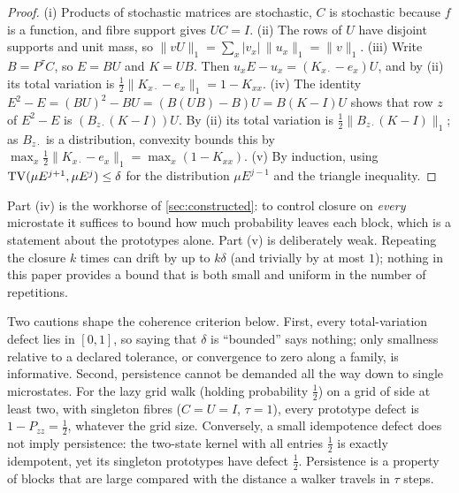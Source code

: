 \begin{proof}
(i) Products of stochastic matrices are stochastic, $C$ is stochastic because $f$ is a function, and fibre support gives $UC=I$.
(ii) The rows of $U$ have disjoint supports and unit mass, so $\|vU\|_1=\sum_x|v_x|\,\|u_x\|_1=\|v\|_1$.
(iii) Write $B=P^{\tau}C$, so $E=BU$ and $K=UB$.
Then $u_xE-u_x=(K_{x\cdot}-e_x)U$, and by (ii) its total variation is $\tfrac12\|K_{x\cdot}-e_x\|_1=1-K_{xx}$.
(iv) The identity $E^2-E=(BU)^2-BU=(B(UB)-B)U=B(K-I)U$ shows that row $z$ of $E^2-E$ is $(B_{z\cdot}(K-I))U$.
By (ii) its total variation is $\tfrac12\|B_{z\cdot}(K-I)\|_1$; as $B_{z\cdot}$ is a distribution, convexity bounds this by $\max_x\tfrac12\|K_{x\cdot}-e_x\|_1=\max_x(1-K_{xx})$.
(v) By induction, using $\mathrm{TV}(\mu E^{j+1},\mu E^{j})\le\delta$ for the distribution $\mu E^{j-1}$ and the triangle inequality.
\end{proof}


Part (iv) is the workhorse of \cref{sec:constructed}: to control closure on \emph{every} microstate it suffices to bound how much probability leaves each block, which is a statement about the prototypes alone.
Part (v) is deliberately weak.
Repeating the closure $k$ times can drift by up to $k\delta$ (and trivially by at most $1$); nothing in this paper provides a bound that is both small and uniform in the number of repetitions.

Two cautions shape the coherence criterion below.
First, every total-variation defect lies in $[0,1]$, so saying that $\delta$ is ``bounded'' says nothing; only smallness relative to a declared tolerance, or convergence to zero along a family, is informative.
Second, persistence cannot be demanded all the way down to single microstates.
For the lazy grid walk (holding probability $\tfrac12$) on a grid of side at least two, with singleton fibres ($C=U=I$, $\tau=1$), every prototype defect is $1-P_{zz}=\tfrac12$, whatever the grid size.
Conversely, a small idempotence defect does not imply persistence: the two-state kernel with all entries $\tfrac12$ is exactly idempotent, yet its singleton prototypes have defect $\tfrac12$.
Persistence is a property of blocks that are large compared with the distance a walker travels in $\tau$ steps.

